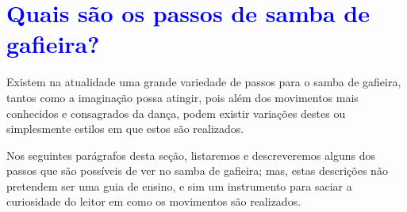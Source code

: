 \section{\textcolor{blue}{Quais são os passos de samba de gafieira?}}

Existem na atualidade uma grande variedade de passos para o samba de gafieira,
tantos como a imaginação possa atingir, pois além dos movimentos mais conhecidos e  consagrados da dança,
podem existir variações  destes ou simplesmente estilos em que estos são realizados. 

Nos seguintes parágrafos desta seção, listaremos e descreveremos 
alguns dos passos que são possíveis de ver no samba de gafieira;
mas, estas descrições não pretendem ser uma guia de ensino,
e sim um instrumento para saciar a curiosidade do leitor em como os movimentos são realizados.\\

